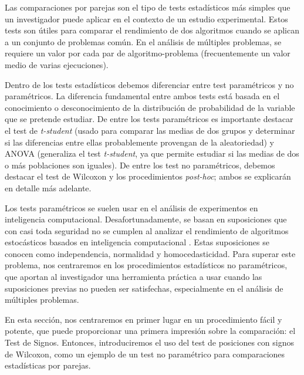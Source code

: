 Las comparaciones por parejas son el tipo de tests estadísticos más simples que un investigador puede aplicar en el contexto de un estudio experimental. 
Estos tests son útiles para comparar el rendimiento de dos algoritmos cuando se aplican a un conjunto de problemas común. 
En el análisis de múltiples problemas, se requiere un valor por cada par de algoritmo-problema (frecuentemente un valor medio de varias ejecuciones). 

Dentro de los tests estadísticos debemos diferenciar entre test paramétricos y no paramétricos. 
La diferencia fundamental entre ambos tests está basada en el conocimiento o desconocimiento de la distribución de probabilidad de la variable que se pretende estudiar. 
De entre los tests paramétricos es importante destacar el test de \textit{t-student} (usado para comparar las medias de dos grupos y determinar si las diferencias entre ellas probablemente provengan de la aleatoriedad) y ANOVA (generaliza el test \textit{t-student}, ya que permite estudiar si las medias de dos o más poblaciones son iguales). 
De entre los test no paramétricos, debemos destacar el test de Wilcoxon y los procedimientos \textit{post-hoc}; ambos se explicarán en detalle más adelante. 

Los tests paramétricos se suelen usar en el análisis de experimentos en inteligencia computacional. 
Desafortunadamente, se basan en suposiciones que con casi toda seguridad no se cumplen al analizar el rendimiento de algoritmos estocásticos basados en inteligencia computacional \parencite{garciaStudyUseNonparametric2009}. 
Estas suposiciones se conocen como independencia, normalidad y homocedasticidad. 
Para superar este problema, nos centraremos en los procedimientos estadísticos no paramétricos, que aportan al investigador una herramienta práctica a usar cuando las suposiciones previas no pueden ser satisfechas, especialmente en el análisis de múltiples problemas. 

En esta sección, nos centraremos en primer lugar en un procedimiento fácil y potente, que puede proporcionar una primera impresión sobre la comparación: el Test de Signos. 
Entonces, introduciremos el uso del test de posiciones con signos de Wilcoxon, como un ejemplo de un test no paramétrico para comparaciones estadísticas por parejas. 

